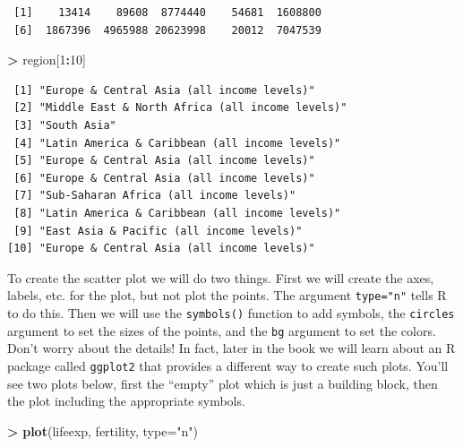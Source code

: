 \documentclass[
]{krantz}
\makeatletter
\newenvironment{Shaded}{\begin{snugshade}}{\end{snugshade}}
\newcommand{\DataTypeTok}[1]{\textcolor[rgb]{0.27,0.27,0.27}{#1}}
\newcommand{\DecValTok}[1]{\textcolor[rgb]{0.06,0.06,0.06}{#1}}
\newcommand{\KeywordTok}[1]{\textcolor[rgb]{0.27,0.27,0.27}{\textbf{#1}}}
\newcommand{\NormalTok}[1]{#1}
\newcommand{\OperatorTok}[1]{\textcolor[rgb]{0.43,0.43,0.43}{\textbf{#1}}}
\newcommand{\StringTok}[1]{\textcolor[rgb]{0.5,0.5,0.5}{#1}}
\newenvironment{kframe}{%
\medskip{}
\setlength{\fboxsep}{.8em}
 \def\at@end@of@kframe{}%
 \ifinner\ifhmode%
  \def\at@end@of@kframe{\end{minipage}}%
  \begin{minipage}{\columnwidth}%
 \fi\fi%
 \def\FrameCommand##1{\hskip\@totalleftmargin \hskip-\fboxsep
 \colorbox{shadecolor}{##1}\hskip-\fboxsep
     \hskip-\linewidth \hskip-\@totalleftmargin \hskip\columnwidth}%
 \MakeFramed {\advance\hsize-\width
   \@totalleftmargin\z@ \linewidth\hsize
   \@setminipage}}%
 {\par\unskip\endMakeFramed%
 \at@end@of@kframe}
\renewenvironment{Shaded}{\begin{kframe}}{\end{kframe}}
\makeatother
\begin{document}
\begin{verbatim}
 [1]    13414    89608  8774440    54681  1608800
 [6]  1867396  4965988 20623998    20012  7047539
\end{verbatim}

\begin{Shaded}
\begin{Highlighting}[]
\OperatorTok{\textgreater{}}\StringTok{ }\NormalTok{region[}\DecValTok{1}\OperatorTok{:}\DecValTok{10}\NormalTok{]}
\end{Highlighting}
\end{Shaded}

\begin{verbatim}
 [1] "Europe & Central Asia (all income levels)"     
 [2] "Middle East & North Africa (all income levels)"
 [3] "South Asia"                                    
 [4] "Latin America & Caribbean (all income levels)" 
 [5] "Europe & Central Asia (all income levels)"     
 [6] "Europe & Central Asia (all income levels)"     
 [7] "Sub-Saharan Africa (all income levels)"        
 [8] "Latin America & Caribbean (all income levels)" 
 [9] "East Asia & Pacific (all income levels)"       
[10] "Europe & Central Asia (all income levels)"     
\end{verbatim}

To create the scatter plot we will do two things. First we will create the axes, labels, etc. for the plot, but not plot the points. The argument \texttt{type="n"} tells R to do this. Then we will use the \texttt{symbols()} function to add symbols, the \texttt{circles} argument to set the sizes of the points, and the \texttt{bg} argument to set the colors. Don't worry about the details! In fact, later in the book we will learn about an R package called
\texttt{ggplot2} that provides a different way to create such plots. You'll see two plots below, first the ``empty'' plot which is just a building block, then the plot including the appropriate symbols.

\begin{Shaded}
\begin{Highlighting}[]
\OperatorTok{\textgreater{}}\StringTok{ }\KeywordTok{plot}\NormalTok{(lifeexp, fertility, }\DataTypeTok{type=}\StringTok{"n"}\NormalTok{)}
\end{Highlighting}
\end{Shaded}
\end{document}
